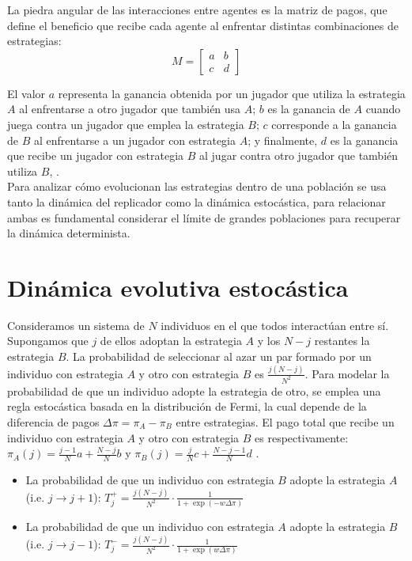 \documentclass[%
 sor,
 jor,
 amsmath,amssymb,
 reprint,%
]{revtex4-2}
\begin{document}
La piedra angular de las interacciones entre agentes es la matriz de pagos, que define el beneficio que recibe cada agente al enfrentar distintas combinaciones de estrategias:
\begin{equation}
M =
\begin{bmatrix}
a & b \\
c & d
\end{bmatrix}
\end{equation}

El valor \(a\) representa la ganancia obtenida por un jugador que utiliza la estrategia \(A\) al enfrentarse a otro jugador que también usa \(A\); \(b\) es la ganancia de \(A\) cuando juega contra un jugador que emplea la estrategia \(B\); \(c\) corresponde a la ganancia de \(B\) al enfrentarse a un jugador con estrategia \(A\); y finalmente, \(d\) es la ganancia que recibe un jugador con estrategia \(B\) al jugar contra otro jugador que también utiliza \(B\), \cite{Arne}.
\\

Para analizar cómo evolucionan las estrategias dentro de una población se usa tanto la dinámica del replicador como la dinámica estocástica, para relacionar ambas es fundamental considerar el límite de grandes poblaciones para recuperar la dinámica determinista.

\section{\label{sec:level2}Dinámica evolutiva estocástica}
\label{defpaymed}

Consideramos un sistema de \(N\) individuos en el que todos interactúan entre sí. Supongamos que \(j\) de ellos adoptan la estrategia \(A\) y los \(N - j\) restantes la estrategia \(B\).
La probabilidad de seleccionar al azar un par formado por un individuo con estrategia \(A\) y otro con estrategia \(B\) es \(\frac{j(N - j)}{N^2}\). Para modelar la probabilidad de que un individuo adopte la estrategia de otro, se emplea una regla estocástica basada en la distribución de Fermi, la cual depende de la diferencia de pagos \(\Delta \pi=\pi_A-\pi_B\) entre estrategias. El pago total que recibe un individuo con estrategia \(A\) y otro con estrategia \(B\) es respectivamente: \(\pi_A(j) = \frac{j - 1}{N} a + \frac{N - j}{N} b\) y  
\(\pi_B(j) = \frac{j}{N} c + \frac{N - j - 1}{N} d\) \cite{Ruben}.

\begin{itemize}
    \item La probabilidad de que un individuo con estrategia \(B\) adopte la estrategia \(A\) (i.e. \(j \rightarrow j+ 1\)): $T_j^+ = \frac{j(N - j)}{N^2} \cdot \frac{1}{1 + \exp(-w \Delta \pi)}$
    

    \item La probabilidad de que un individuo con estrategia \(A\) adopte la estrategia \(B\) (i.e. \(j \rightarrow j - 1\)): $T_j^- = \frac{j(N - j)}{N^2} \cdot \frac{1}{1 + \exp(w \Delta \pi)}$
    
\end{itemize}
\end{document}
